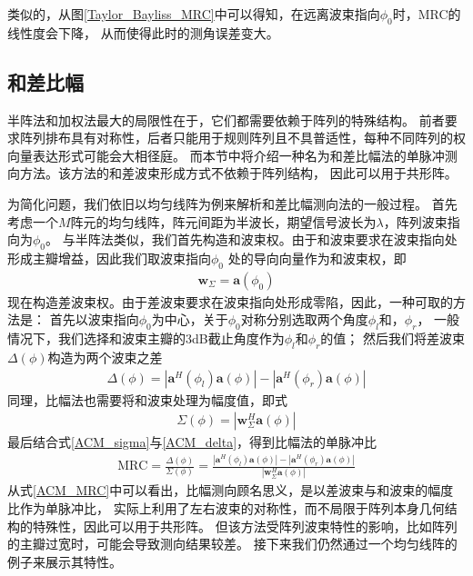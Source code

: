 \documentclass[master]{thesis-uestc}
\begin{document}
类似的，从图\ref{Taylor_Bayliss_MRC}中可以得知，在远离波束指向$\phi_0$时，MRC的线性度会下降，
从而使得此时的测角误差变大。

\subsection{和差比幅}
半阵法和加权法最大的局限性在于，它们都需要依赖于阵列的特殊结构。
前者要求阵列排布具有对称性，后者只能用于规则阵列且不具普适性，每种不同阵列的权向量表达形式可能会大相径庭。
而本节中将介绍一种名为和差比幅法的单脉冲测向方法。该方法的和差波束形成方式不依赖于阵列结构，
因此可以用于共形阵。

为简化问题，我们依旧以均匀线阵为例来解析和差比幅测向法的一般过程。
首先考虑一个$M$阵元的均匀线阵，阵元间距为半波长，期望信号波长为$\lambda$，阵列波束指向为$\phi_0$。
与半阵法类似，我们首先构造和波束权。由于和波束要求在波束指向处形成主瓣增益，因此我们取波束指向$\phi_0$
处的导向向量作为和波束权，即
\begin{equation}\label{ACM_w_s}
    \begin{aligned}
        \bm{w}_\Sigma = \bm{a}(\phi_0)
    \end{aligned}
\end{equation}
现在构造差波束权。由于差波束要求在波束指向处形成零陷，因此，一种可取的方法是：
首先以波束指向$\phi_0$为中心，关于$\phi_0$对称分别选取两个角度$\phi_l$和，$\phi_r$，
一般情况下，我们选择和波束主瓣的3dB截止角度作为$\phi_l$和$\phi_r$的值；
然后我们将差波束$\Delta(\phi)$构造为两个波束之差
\begin{equation}\label{ACM_delta}
    \begin{aligned}
        \Delta(\phi) = \left|\bm{a}^H(\phi_l)\bm{a}(\phi)\right| - 
                       \left|\bm{a}^H(\phi_r)\bm{a}(\phi)\right|
    \end{aligned}
\end{equation}
同理，比幅法也需要将和波束处理为幅度值，即式
\begin{equation}\label{ACM_sigma}
    \begin{aligned}
        \Sigma(\phi) = \left|\bm{w}_\Sigma^H\bm{a}(\phi)\right|
    \end{aligned}
\end{equation}
最后结合式\eqref{ACM_sigma}与\eqref{ACM_delta}，得到比幅法的单脉冲比
\begin{equation}\label{ACM_MRC}
    \begin{aligned}
        \text{MRC} = \frac{\Delta(\phi)}{\Sigma(\phi)}
                   = \frac{ \left|\bm{a}^H(\phi_l)\bm{a}(\phi)\right| - 
                            \left|\bm{a}^H(\phi_r)\bm{a}(\phi)\right| }
                          { \left|\bm{w}_\Sigma^H\bm{a}(\phi)\right| }
    \end{aligned}
\end{equation}
从式\eqref{ACM_MRC}中可以看出，比幅测向顾名思义，是以差波束与和波束的幅度比作为单脉冲比，
实际上利用了左右波束的对称性，而不局限于阵列本身几何结构的特殊性，因此可以用于共形阵。
但该方法受阵列波束特性的影响，比如阵列的主瓣过宽时，可能会导致测向结果较差。
接下来我们仍然通过一个均匀线阵的例子来展示其特性。
\end{document}
